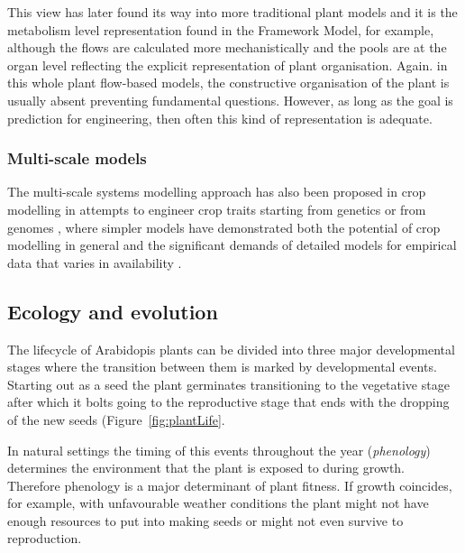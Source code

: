 This view has later found its way into more traditional plant models and it is
the metabolism level representation found in the Framework Model, for example,
although the flows are calculated more mechanistically and the pools are at the
organ level reflecting the explicit representation of plant organisation. Again.
in this whole plant flow-based models, the constructive organisation of the
plant is usually absent preventing fundamental questions. However, as long as
the goal is prediction for engineering, then often this kind of representation
is adequate.


\subsubsection*{Multi-scale models}
The multi-scale systems modelling approach has also been proposed in crop
modelling in attempts to engineer crop traits starting from genetics or from
genomes \citep{welch_merging_2005, yin_applying_nodate, yin_modelling_2010,
  parent_can_2014, wu_connecting_2016, chenu_integrating_2018}, where simpler
models have demonstrated both the potential of crop modelling in general and the
significant demands of detailed models for empirical data that varies in
availability \citep{hammer_models_2006,asseng_uncertainty_2013}.


\subsection{Ecology and evolution}
%
The lifecycle of Arabidopis plants can be divided into three major
developmental stages where the transition between them is marked by
developmental events. Starting out as a seed the plant germinates transitioning
to the vegetative stage after which it bolts going to the reproductive stage
that ends with the dropping of the new seeds (Figure~\ref{fig:plantLife}.

In natural settings the timing of this events throughout the year
(\emph{phenology}) determines the environment that the plant is exposed to
during growth. Therefore phenology is a major determinant of plant fitness. If
growth coincides, for example, with unfavourable weather conditions the plant
might not have enough resources to put into making seeds or might not even
survive to reproduction.

